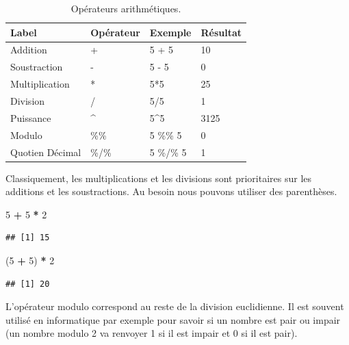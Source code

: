 \documentclass[]{book}
\newenvironment{Shaded}{\begin{snugshade}}{\end{snugshade}}
\newcommand{\DecValTok}[1]{\textcolor[rgb]{0.00,0.00,0.81}{#1}}
\newcommand{\NormalTok}[1]{#1}
\newcommand{\OperatorTok}[1]{\textcolor[rgb]{0.81,0.36,0.00}{\textbf{#1}}}
\newcommand{\StringTok}[1]{\textcolor[rgb]{0.31,0.60,0.02}{#1}}
\begin{document}
\begin{table}[t]

\caption{\label{tab:tabOpAri}Opérateurs arithmétiques.\label{tab:tabOpAri}}
\centering
\begin{tabular}{l|l|l|l}
\hline
Label & Opérateur & Exemple & Résultat\\
\hline
Addition & + & 5 + 5 & 10\\
\hline
Soustraction & - & 5 - 5 & 0\\
\hline
Multiplication & * & 5*5 & 25\\
\hline
Division & / & 5/5 & 1\\
\hline
Puissance & \textasciicircum{} & 5\textasciicircum{}5 & 3125\\
\hline
Modulo & \%\% & 5 \%\% 5 & 0\\
\hline
Quotien Décimal & \%/\% & 5 \%/\% 5 & 1\\
\hline
\end{tabular}
\end{table}

Classiquement, les multiplications et les divisions sont prioritaires sur les additions et les soustractions. Au besoin nous pouvons utiliser des parenthèses.

\begin{Shaded}
\begin{Highlighting}[]
\DecValTok{5} \OperatorTok{+}\StringTok{ }\DecValTok{5} \OperatorTok{*}\StringTok{ }\DecValTok{2}
\end{Highlighting}
\end{Shaded}

\begin{verbatim}
## [1] 15
\end{verbatim}

\begin{Shaded}
\begin{Highlighting}[]
\NormalTok{(}\DecValTok{5} \OperatorTok{+}\StringTok{ }\DecValTok{5}\NormalTok{) }\OperatorTok{*}\StringTok{ }\DecValTok{2}
\end{Highlighting}
\end{Shaded}

\begin{verbatim}
## [1] 20
\end{verbatim}

L'opérateur modulo correspond au reste de la division euclidienne. Il est souvent utilisé en informatique par exemple pour savoir si un nombre est pair ou impair (un nombre modulo 2 va renvoyer 1 si il est impair et 0 si il est pair).
\end{document}
